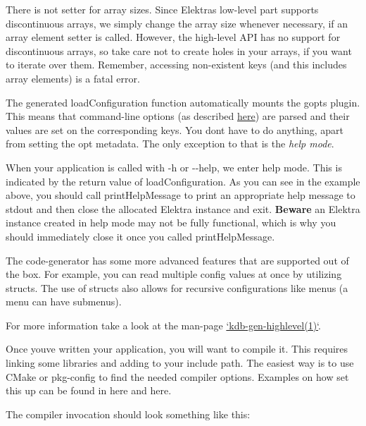 There is not setter for array sizes. Since Elektra\textquotesingle{}s low-\/level part supports discontinuous arrays, we simply change the array size whenever necessary, if an array element setter is called. However, the high-\/level A\+PI has no support for discontinuous arrays, so take care not to create holes in your arrays, if you want to iterate over them. Remember, accessing non-\/existent keys (and this includes array elements) is a fatal error.

The generated {\ttfamily load\+Configuration} function automatically mounts the {\ttfamily gopts} plugin. This means that command-\/line options (as described \hyperlink{doc_tutorials_command-line-options_md}{here}) are parsed and their values are set on the corresponding keys. You don\textquotesingle{}t have to do anything, apart from setting the {\ttfamily opt} metadata. The only exception to that is the {\itshape help mode}.

When your application is called with {\ttfamily -\/h} or {\ttfamily -\/-\/help}, we enter help mode. This is indicated by the return value {} of {\ttfamily load\+Configuration}. As you can see in the example above, you should call {\ttfamily print\+Help\+Message} to print an appropriate help message to {\ttfamily stdout} and then close the allocated {\ttfamily Elektra} instance and {\ttfamily exit}. {\bfseries Beware} an {\ttfamily Elektra} instance created in help mode may not be fully functional, which is why you should immediately close it once you called {\ttfamily print\+Help\+Message}.

The code-\/generator has some more advanced features that are supported out of the box. For example, you can read multiple config values at once by utilizing structs. The use of structs also allows for recursive configurations like menus (a menu can have submenus).

For more information take a look at the man-\/page \hyperlink{doc_help_kdb-gen-highlevel_md}{`kdb-\/gen-\/highlevel(1)`}.

Once you\textquotesingle{}ve written your application, you will want to compile it. This requires linking some libraries and adding to your include path. The easiest way is to use C\+Make or pkg-\/config to find the needed compiler options. Examples on how set this up can be found in here and here.

The compiler invocation should look something like this\+:

